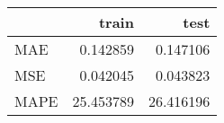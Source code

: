 \begin{tabular}{lrr}
\toprule
{} &      train &       test \\
\midrule
MAE  &   0.142859 &   0.147106 \\
MSE  &   0.042045 &   0.043823 \\
MAPE &  25.453789 &  26.416196 \\
\bottomrule
\end{tabular}
